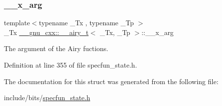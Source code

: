 \subsubsection{\texorpdfstring{\+\_\+\+\_\+x\+\_\+arg}{\_\_x\_arg}}
{\footnotesize\ttfamily template$<$typename \+\_\+\+Tx , typename \+\_\+\+Tp $>$ \\
\+\_\+\+Tx \hyperlink{struct____gnu__cxx_1_1____airy__t}{\+\_\+\+\_\+gnu\+\_\+cxx\+::\+\_\+\+\_\+airy\+\_\+t}$<$ \+\_\+\+Tx, \+\_\+\+Tp $>$\+::\+\_\+\+\_\+x\+\_\+arg}



The argument of the Airy fuctions. 



Definition at line 355 of file specfun\+\_\+state.\+h.



The documentation for this struct was generated from the following file\+:\begin{DoxyCompactItemize}
\item 
include/bits/\hyperlink{specfun__state_8h}{specfun\+\_\+state.\+h}\end{DoxyCompactItemize}
